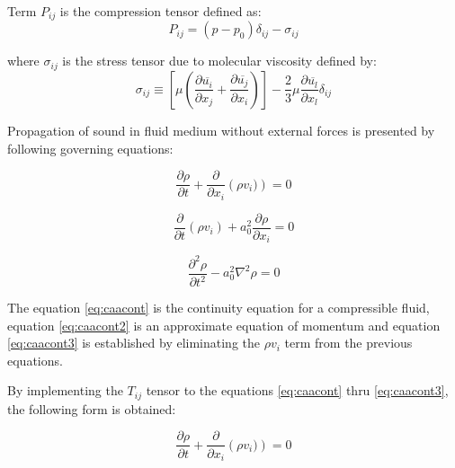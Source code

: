 Term $P_{ij}$ is the compression tensor defined as:
\begin{equation} \label{eq:Ptensor}
P_{ij} = (p - p_0)\delta_{ij} - \sigma_{ij}
\end{equation}

\noindent where $\sigma_{ij}$ is the stress tensor due to molecular viscosity defined by:
\begin{equation} \label{eq:viscstress}
\sigma_{ij}
\equiv
\left[ \mu \left( \frac{\partial \overline{u_i}}{\partial x_{j}} + \frac{\partial \overline{u_j}}{\partial x_{i}} \right) \right]
- \frac{2}{3} \mu \frac{\partial \overline{u_l}}{\partial x_l} \delta_{ij}
\end{equation}

Propagation of sound in fluid medium without external forces is presented by following governing equations:

\begin{equation} \label{eq:caacont}
\frac{\partial \rho}{\partial t} + \frac{\partial}{\partial x_i} \left( \rho v_i) \right) = 0
\end{equation}

\begin{equation} \label{eq:caacont2}
\frac{\partial}{\partial t} \left(\rho v_i \right) + a_0^2\frac{\partial \rho}{\partial x_i} = 0
\end{equation}

\begin{equation} \label{eq:caacont3}
\frac{\partial^2 \rho}{\partial t^2} - a_0^2 \nabla^2 \rho = 0
\end{equation}

The equation \ref{eq:caacont} is the continuity equation for a compressible fluid, equation \ref{eq:caacont2} is an approximate equation of momentum and equation \ref{eq:caacont3} is established by eliminating the $\rho v_i$ term from the previous equations.

%
By implementing the $T_{ij}$ tensor to the equations \ref{eq:caacont} thru \ref{eq:caacont3}, the following form is obtained: 

\begin{equation} \label{eq:caacont4}
\frac{\partial \rho}{\partial t} + \frac{\partial}{\partial x_i} \left( \rho v_i) \right) = 0
\end{equation}

